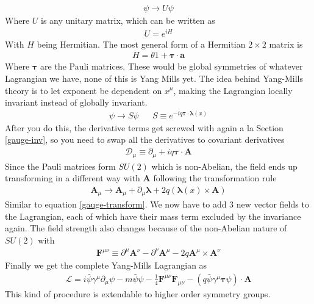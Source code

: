 \begin{align}
\psi\rightarrow U\psi
\end{align} 
Where $U$ is any unitary matrix, which can be written as
\begin{align}
U = e^{iH}
\end{align}
With $H$ being Hermitian. The most general form of a Hermitian $2\times2$ matrix is
\begin{align}
H = \theta 1 + \boldsymbol{\tau}\cdot\textbf{a}
\end{align} 
Where $\boldsymbol{\tau}$ are the Pauli matrices. These would be global symmetries of whatever Lagrangian we have, none of this is Yang Mills yet. The idea behind Yang-Mills theory is to let exponent be dependent on $x^\mu$, making the Lagrangian locally invariant instead of globally invariant.
\begin{align}
\psi\rightarrow S\psi && S\equiv e^{-iq\boldsymbol{\tau}\cdot\boldsymbol{\lambda}(x)}
\end{align}
After you do this, the derivative terms get screwed with again a la Section \ref{gauge-inv}, so you need to swap all the derivatives to covariant derivatives
\begin{align}
\mathcal{D}_\mu \equiv \partial_\mu + iq\boldsymbol{\tau}\cdot\textbf{A}
\end{align}
Since the Pauli matrices form $SU(2)$ which is non-Abelian, the field ends up transforming in a different way with $\textbf{A}$ following the transformation rule
\begin{align}
\textbf{A}_\mu \rightarrow\textbf{A}_\mu + \partial_\mu\boldsymbol{\lambda} + 2q(\boldsymbol{\lambda}(x)\times\textbf{A})
\end{align}
Similar to equation \ref{gauge-transform}. We now have to add 3 new vector fields to the Lagrangian, each of which have their mass term excluded by the invariance again. The field strength also changes because of the non-Abelian nature of $SU(2)$ with
\begin{align}
\textbf{F}^{\mu\nu}\equiv \partial^\mu\textbf{A}^\nu - \partial^\nu\textbf{A}^\mu - 2q\textbf{A}^\mu\times\textbf{A}^\nu
\end{align}
Finally we get the complete Yang-Mills Lagrangian as 
\begin{align}
\mathcal{L} = i\bar{\psi}\gamma^\mu\partial_\mu\psi - m\bar{\psi}\psi - \frac{1}{4}\textbf{F}^{\mu\nu}\textbf{F}_{\mu\nu} - (q\bar{\psi}\gamma^\mu\boldsymbol{\tau}\psi)\cdot\textbf{A}
\end{align}
This kind of procedure is extendable to higher order symmetry groups.


